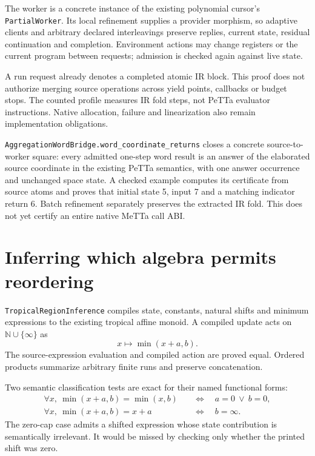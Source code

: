 \documentclass[11pt,a4paper]{article}
\newcommand{\code}[1]{\nolinkurl{#1}}
\begin{document}
The worker is a concrete instance of the existing polynomial cursor's
\code{PartialWorker}. Its local refinement supplies a provider morphism, so
adaptive clients and arbitrary declared interleavings preserve replies,
current state, residual continuation and completion. Environment actions may
change registers or the current program between requests; admission is checked
again against live state.

A run request already denotes a completed atomic IR block. This proof does not
authorize merging source operations across yield points, callbacks or budget
stops. The counted profile measures IR fold steps, not PeTTa evaluator
instructions. Native allocation, failure and linearization also remain
implementation obligations.

\code{AggregationWordBridge.word_coordinate_returns} closes a concrete
source-to-worker square: every admitted one-step word result is an answer of
the elaborated source coordinate in the existing PeTTa semantics, with one
answer occurrence and unchanged space state. A checked example computes its
certificate from source atoms and proves that initial state 5, input 7 and a
matching indicator return 6. Batch refinement separately preserves the
extracted IR fold. This does not yet certify an entire native MeTTa call ABI.

\section{Inferring which algebra permits reordering}

\code{TropicalRegionInference} compiles state, constants, natural shifts and
minimum expressions to the existing tropical affine monoid. A compiled update
acts on $\mathbb N\cup\{\infty\}$ as
\[
  x\longmapsto\min(x+a,b).
\]
The source-expression evaluation and compiled action are proved equal.
Ordered products summarize arbitrary finite runs and preserve concatenation.

Two semantic classification tests are exact for their named functional forms:
\[
\begin{aligned}
 \forall x,\ \min(x+a,b)=\min(x,b)
       &\quad\Longleftrightarrow\quad a=0\ \lor\ b=0,\\
 \forall x,\ \min(x+a,b)=x+a
       &\quad\Longleftrightarrow\quad b=\infty.
\end{aligned}
\]
The zero-cap case admits a shifted expression whose state contribution is
semantically irrelevant. It would be missed by checking only whether the
printed shift was zero.
\end{document}
